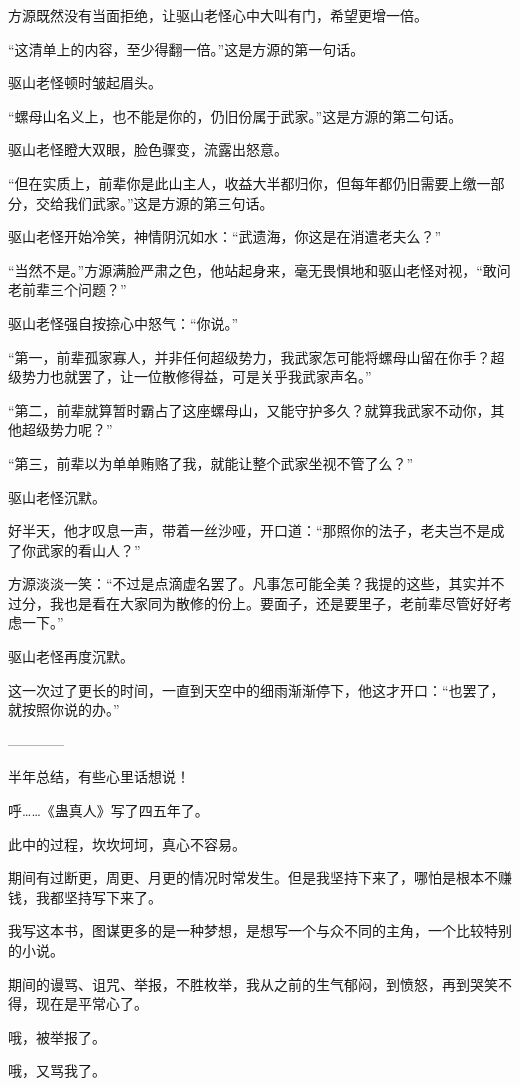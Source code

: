 \begin{this_body}
方源既然没有当面拒绝，让驱山老怪心中大叫有门，希望更增一倍。

“这清单上的内容，至少得翻一倍。”这是方源的第一句话。

驱山老怪顿时皱起眉头。

“螺母山名义上，也不能是你的，仍旧份属于武家。”这是方源的第二句话。

驱山老怪瞪大双眼，脸色骤变，流露出怒意。

“但在实质上，前辈你是此山主人，收益大半都归你，但每年都仍旧需要上缴一部分，交给我们武家。”这是方源的第三句话。

驱山老怪开始冷笑，神情阴沉如水：“武遗海，你这是在消遣老夫么？”

“当然不是。”方源满脸严肃之色，他站起身来，毫无畏惧地和驱山老怪对视，“敢问老前辈三个问题？”

驱山老怪强自按捺心中怒气：“你说。”

“第一，前辈孤家寡人，并非任何超级势力，我武家怎可能将螺母山留在你手？超级势力也就罢了，让一位散修得益，可是关乎我武家声名。”

“第二，前辈就算暂时霸占了这座螺母山，又能守护多久？就算我武家不动你，其他超级势力呢？”

“第三，前辈以为单单贿赂了我，就能让整个武家坐视不管了么？”

驱山老怪沉默。

好半天，他才叹息一声，带着一丝沙哑，开口道：“那照你的法子，老夫岂不是成了你武家的看山人？”

方源淡淡一笑：“不过是点滴虚名罢了。凡事怎可能全美？我提的这些，其实并不过分，我也是看在大家同为散修的份上。要面子，还是要里子，老前辈尽管好好考虑一下。”

驱山老怪再度沉默。

这一次过了更长的时间，一直到天空中的细雨渐渐停下，他这才开口：“也罢了，就按照你说的办。”

------------

半年总结，有些心里话想说！

呼……《蛊真人》写了四五年了。

此中的过程，坎坎坷坷，真心不容易。

期间有过断更，周更、月更的情况时常发生。但是我坚持下来了，哪怕是根本不赚钱，我都坚持写下来了。

我写这本书，图谋更多的是一种梦想，是想写一个与众不同的主角，一个比较特别的小说。

期间的谩骂、诅咒、举报，不胜枚举，我从之前的生气郁闷，到愤怒，再到哭笑不得，现在是平常心了。

哦，被举报了。

哦，又骂我了。


\end{this_body}
